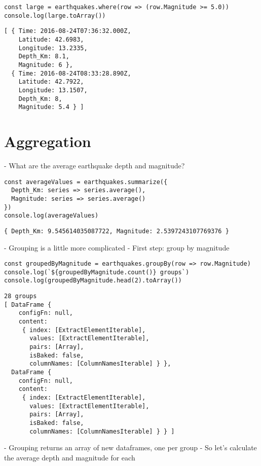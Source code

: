 \begin{verbatim}
const large = earthquakes.where(row => (row.Magnitude >= 5.0))
console.log(large.toArray())
\end{verbatim}

\begin{verbatim}
[ { Time: 2016-08-24T07:36:32.000Z,
    Latitude: 42.6983,
    Longitude: 13.2335,
    Depth_Km: 8.1,
    Magnitude: 6 },
  { Time: 2016-08-24T08:33:28.890Z,
    Latitude: 42.7922,
    Longitude: 13.1507,
    Depth_Km: 8,
    Magnitude: 5.4 } ]
\end{verbatim}
    
\section{Aggregation}\label{s:dataforge-aggregate}

-   What are the average earthquake depth and magnitude?

\begin{verbatim}
const averageValues = earthquakes.summarize({
  Depth_Km: series => series.average(),
  Magnitude: series => series.average()
})
console.log(averageValues)
\end{verbatim}

\begin{verbatim}
{ Depth_Km: 9.545614035087722, Magnitude: 2.5397243107769376 }
\end{verbatim}

-   Grouping is a little more complicated
-   First step: group by magnitude

\begin{verbatim}
const groupedByMagnitude = earthquakes.groupBy(row => row.Magnitude)
console.log(`${groupedByMagnitude.count()} groups`)
console.log(groupedByMagnitude.head(2).toArray())
\end{verbatim}

\begin{verbatim}
28 groups
[ DataFrame {
    configFn: null,
    content:
     { index: [ExtractElementIterable],
       values: [ExtractElementIterable],
       pairs: [Array],
       isBaked: false,
       columnNames: [ColumnNamesIterable] } },
  DataFrame {
    configFn: null,
    content:
     { index: [ExtractElementIterable],
       values: [ExtractElementIterable],
       pairs: [Array],
       isBaked: false,
       columnNames: [ColumnNamesIterable] } } ]
\end{verbatim}

-   Grouping returns an array of new dataframes, one per group
-   So let's calculate the average depth and magnitude for each

